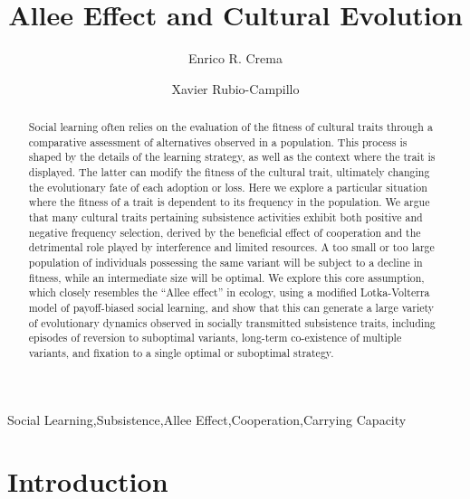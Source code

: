 \documentclass[preprint,authoryear]{elsarticle}
\begin{document}
\begin{frontmatter}

\title{Allee Effect and Cultural Evolution}

\author[label1]{Enrico R. Crema}
\author[label2]{Xavier Rubio-Campillo}

\address[label1]{CaSEs - Complexity and Socio-Ecological Dynamics Research Group, Barcelona}
\address[label2]{BSC - Barcelona Supercomputing Center}
\begin{abstract}
Social learning often relies on the evaluation of the fitness of cultural traits through a comparative assessment of alternatives observed in a population. This process is shaped by the details of the learning strategy, as well as the context where the trait is displayed. The latter can modify the fitness of the cultural trait, ultimately changing the evolutionary fate of each adoption or loss. Here we explore a particular situation where the fitness of a trait is dependent to its frequency in the population.  We argue that many cultural traits pertaining subsistence activities exhibit both positive and negative frequency selection, derived by the beneficial effect of cooperation and the detrimental role played by interference and limited resources. A too small or too large population of individuals possessing the same variant will be subject to a decline in fitness, while an intermediate size will be optimal. We explore this core assumption, which closely resembles the “Allee effect” in ecology, using a modified Lotka-Volterra model of payoff-biased social learning, and show that this can generate a large variety of evolutionary dynamics observed in socially transmitted subsistence traits,  including episodes of reversion to suboptimal variants, long-term co-existence of multiple variants, and fixation to a single optimal or suboptimal strategy.
\end{abstract}

\begin{keyword}
Social Learning\sep Subsistence\sep Allee Effect\sep Cooperation\sep Carrying Capacity
\end{keyword}

\end{frontmatter}

\section{Introduction}
\end{document}
